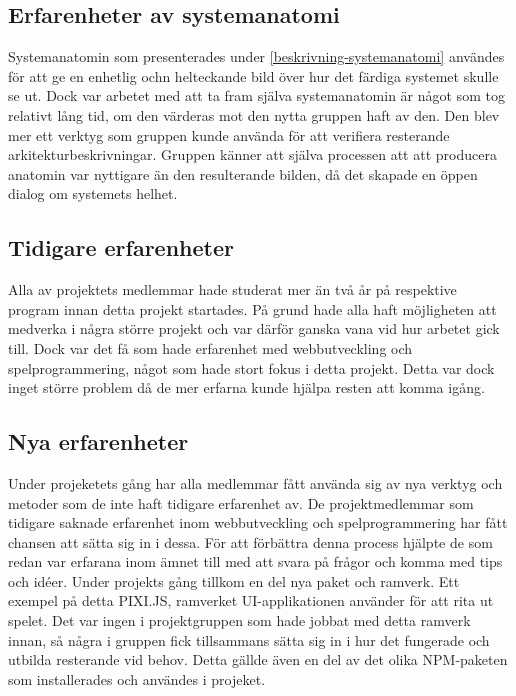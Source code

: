 \subsection{Erfarenheter av systemanatomi}
Systemanatomin som presenterades under \ref{beskrivning-systemanatomi} användes för att ge en enhetlig ochn helteckande bild över hur det färdiga systemet skulle se ut. Dock var arbetet med att ta fram själva systemanatomin är något som tog relativt lång tid, om den värderas mot den nytta gruppen haft av den. Den blev mer ett verktyg som gruppen kunde använda för att verifiera resterande arkitekturbeskrivningar. Gruppen känner att själva processen att att producera anatomin var nyttigare än den resulterande bilden, då det skapade en öppen dialog om systemets helhet.

\subsection{Tidigare erfarenheter}
Alla av projektets medlemmar hade studerat mer än två år på respektive program innan detta projekt startades. På grund hade alla haft möjligheten att medverka i några större projekt och var därför ganska vana vid hur arbetet gick till. Dock var det få som hade erfarenhet med webbutveckling och spelprogrammering, något som hade stort fokus i detta projekt. Detta var dock inget större problem då de mer erfarna kunde hjälpa resten att komma igång.

\subsection{Nya erfarenheter}
Under projeketets gång har alla medlemmar fått använda sig av nya verktyg och metoder som de inte haft tidigare erfarenhet av. De projektmedlemmar som tidigare saknade erfarenhet inom webbutveckling och spelprogrammering har fått chansen att sätta sig in i dessa. För att förbättra denna process hjälpte de som redan var erfarana inom ämnet till med att svara på frågor och komma med tips och idéer. Under projekts gång tillkom en del nya paket och ramverk. Ett exempel på detta PIXI.JS, ramverket UI-applikationen använder för att rita ut spelet. Det var ingen i projektgruppen som hade jobbat med detta ramverk innan, så några i gruppen fick tillsammans sätta sig in i hur det fungerade och utbilda resterande vid behov. Detta gällde även en del av det olika NPM-paketen som installerades och användes i projeket.


